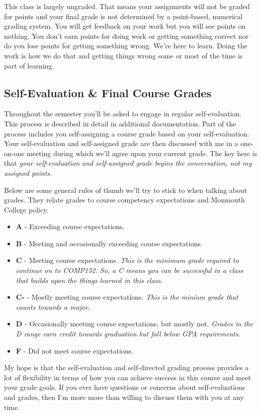 \documentclass[10pt]{article}
\begin{document}
This class is largely ungraded. That means your assignments will not be graded for points and your final grade
is not determined by a point-based, numerical grading system. You will get feedback on your work but you will
see points on nothing. You don't earn points for doing work or getting something correct nor do you lose points
for getting something wrong. We're here to learn. Doing the work is how we do that and getting things wrong
some or most of the time is part of learning.

\subsection{Self-Evaluation \& Final Course Grades}

Throughout the semester you'll be asked to engage in regular self-evaluation. This process is described in
detail in additional documentation. Part of the process includes you self-assigning a course grade based on
your self-evaluation. Your self-evaluation and self-assigned grade are then discussed with me in a one-on-one
meeting during which we'll agree upon your current grade. The key here is that \textit{your self-evaluation
and self-assigned grade begins the conversation, not my assigned points.}

Below are some general rules of thumb we'll try to stick to when talking about grades. They relate grades to
course competency expectations and Monmouth College policy.
\begin{itemize}
  \item \textbf{A} - Exceeding course expectations.
  \item \textbf{B} - Meeting and occasionally exceeding course expectations.
  \item \textbf{C} - Meeting course expectations. \textit{This is the minimum grade required to continue on to COMP152. So, a C means you can be successful in a class that builds upon the things learned in this class.}
  \item \textbf{C-} - Mostly meeting course expectations. \textit{This is the minium grade that counts towards a major.}
  \item \textbf{D} - Occasionally meeting course expectations, but mostly not. \textit{Grades in the D range earn credit towards graduation but fall below GPA requirements.}
  \item \textbf{F} - Did not meet course expectations.
\end{itemize}

My hope is that the self-evaluation and self-directed grading process provides a lot of flexibility in terms
of how you can achieve success in this course and meet your grade goals. If you ever have questions or concerns
about self-evaluations and grades, then I'm more more than willing to discuss them with you at any time.
\end{document}
